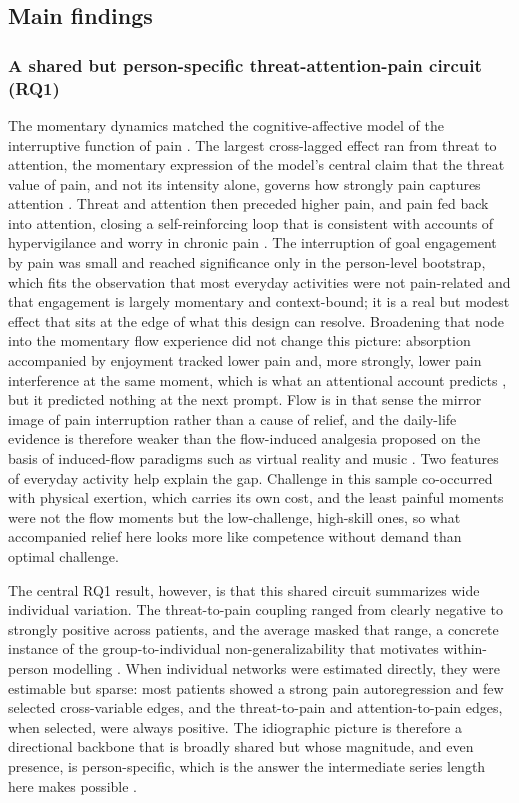 \documentclass[11pt,a4paper]{article}
\begin{document}
\subsection{Main findings}
\subsubsection{A shared but person-specific threat-attention-pain circuit (RQ1)}
The momentary dynamics matched the cognitive-affective model of the interruptive function of pain
\citep{eccleston1999pain}. The largest cross-lagged effect ran from threat to attention, the
momentary expression of the model's central claim that the threat value of pain, and not its
intensity alone, governs how strongly pain captures attention
\citep{crombez1998catastrophizing,crombez2013attention}. Threat and attention then preceded higher
pain, and pain fed back into attention, closing a self-reinforcing loop that is consistent with
accounts of hypervigilance and worry in chronic pain
\citep{eccleston2007worry,vandamme2010keeping,crombez2012fear}. The interruption of goal
engagement by pain was small and reached significance only in the person-level bootstrap, which
fits the observation that most everyday activities were not pain-related
and that engagement is largely momentary and context-bound; it is a real but modest effect that
sits at the edge of what this design can resolve. Broadening that node into the momentary flow
experience did not change this picture: absorption accompanied by enjoyment tracked lower pain and,
more strongly, lower pain interference at the same moment, which is what an attentional account
predicts \citep{vandamme2010keeping}, but it predicted nothing at the next prompt. Flow is in that
sense the mirror image of pain interruption rather than a cause of relief, and the daily-life
evidence is therefore weaker than the flow-induced analgesia proposed on the basis of induced-flow
paradigms such as virtual reality and music \citep{gromakovskis2025flow}. Two features of everyday
activity help explain the gap. Challenge in this sample co-occurred with physical exertion, which
carries its own cost, and the least painful moments were not the flow moments but the low-challenge,
high-skill ones, so what accompanied relief here looks more like competence without demand than
optimal challenge.

The central RQ1 result, however, is that this shared circuit summarizes wide individual variation.
The threat-to-pain coupling ranged from clearly negative to strongly positive across patients, and
the average masked that range, a concrete instance of the group-to-individual
non-generalizability that motivates within-person modelling
\citep{fisher2018lack,molenaar2004manifesto}. When individual networks were estimated directly,
they were estimable but sparse: most patients showed a strong pain autoregression and few selected
cross-variable edges, and the threat-to-pain and attention-to-pain edges, when selected, were
always positive. The idiographic picture is therefore a directional backbone that is broadly
shared but whose magnitude, and even presence, is person-specific, which is the answer the
intermediate series length here makes possible \citep{beltz2016bridging,wright2020personalized}.
\end{document}
